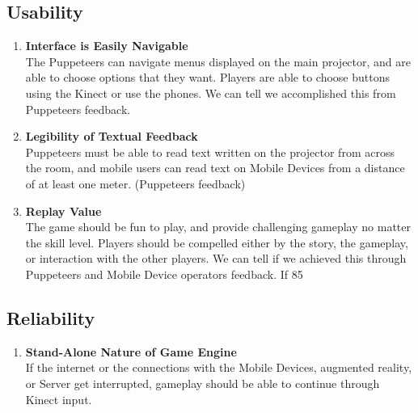 \documentclass[10pt,letterpaper,oneside,english]{report}
\begin{document}
\subsection{Usability}
\begin{enumerate}
\item \textbf{Interface is Easily Navigable} \\ The Puppeteers can navigate menus displayed on the main projector, and are able to choose options that they want. Players are able to choose buttons using the Kinect or use the phones. We can tell we accomplished this from Puppeteers feedback.
\item \textbf{Legibility of Textual Feedback} \\ Puppeteers must be able to read text written on the projector from across the room, and mobile users can read text on Mobile Devices from a distance of at least one meter. (Puppeteers feedback)
\item \textbf{Replay Value} \\ The game should be fun to play, and provide challenging gameplay no matter the skill level. Players should be compelled either by the story, the gameplay, or interaction with the other players. We can tell if we achieved this through Puppeteers and Mobile Device operators feedback. If 85%
\end{enumerate}
\subsection{Reliability}
\begin{enumerate}
\item \textbf{Stand-Alone Nature of Game Engine} \\ If the internet or the connections with the Mobile Devices, augmented reality, or Server get interrupted, gameplay should be able to continue through Kinect input.
\end{enumerate}
\end{document}
